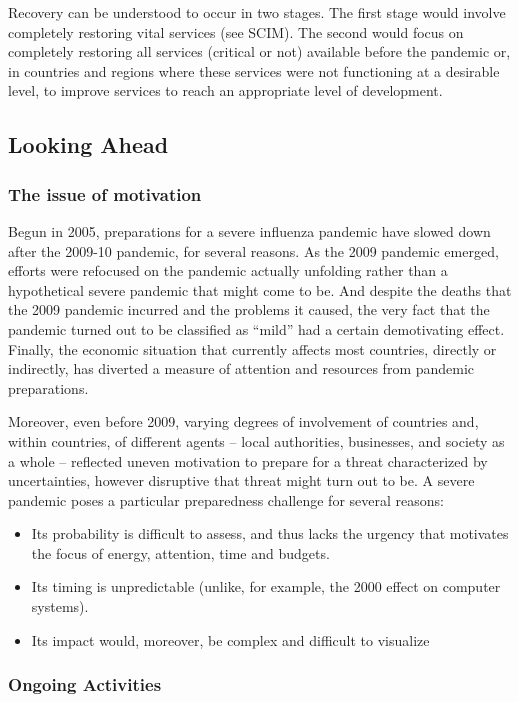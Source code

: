 \documentclass[12pt, a4]{scrartcl}
\begin{document}
Recovery can be understood to occur in two stages. The first stage would involve completely restoring vital services (see SCIM). The second would focus on completely restoring all services (critical or not) available before the pandemic or, in countries and regions where these services were not functioning at a desirable level, to improve services to reach an appropriate level of development.

\subsection {Looking Ahead}
\subsubsection {The issue of motivation}
Begun in 2005, preparations for a severe influenza pandemic have slowed down after the 2009-10 pandemic, for several reasons. As the 2009 pandemic emerged, efforts were refocused on the pandemic actually unfolding rather than a hypothetical severe pandemic that might come to be. And despite the deaths that the 2009 pandemic incurred and the problems it caused, the very fact that the pandemic turned out to be classified as “mild” had a certain demotivating effect. Finally, the economic situation that currently affects most countries, directly or indirectly, has diverted a measure of attention and resources from pandemic preparations.

Moreover, even before 2009, varying degrees of involvement of countries and, within countries, of different agents – local authorities, businesses, and society as a whole – reflected uneven motivation to prepare for a threat characterized by uncertainties, however disruptive that threat might turn out to be. A severe pandemic poses a particular preparedness challenge for several reasons:

\begin{itemize}
	\item Its probability is difficult to assess, and thus lacks the urgency that motivates the focus of energy, attention, time and budgets.
	\item Its timing is unpredictable (unlike, for example, the 2000 effect on computer systems).
	\item Its impact would, moreover, be complex and difficult to visualize
\end{itemize}

\subsubsection{Ongoing Activities}
\end{document}
